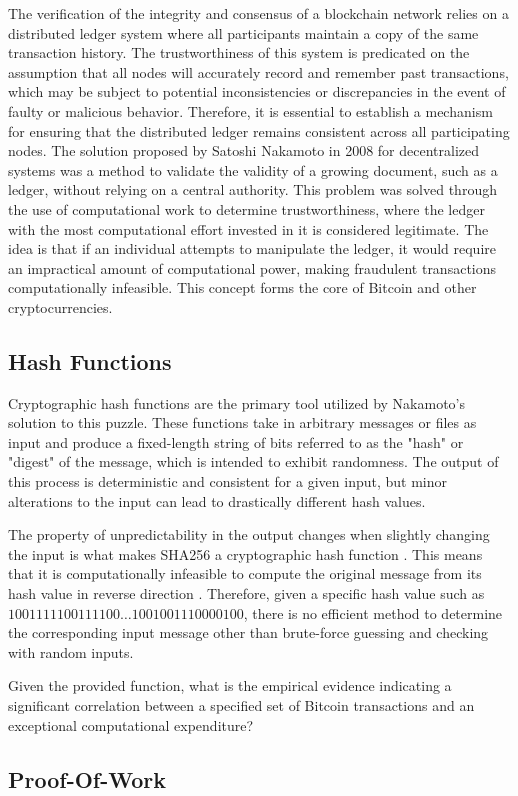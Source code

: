 %

The verification of the integrity and consensus of a blockchain network relies on a distributed ledger system where all participants maintain a copy of the same transaction history. The trustworthiness of this system is predicated on the assumption that all nodes will accurately record and remember past transactions, which may be subject to potential inconsistencies or discrepancies in the event of faulty or malicious behavior. Therefore, it is essential to establish a mechanism for ensuring that the distributed ledger remains consistent across all participating nodes. The solution proposed by Satoshi Nakamoto in 2008 for decentralized systems was a method to validate the validity of a growing document, such as a ledger, without relying on a central authority. This problem was solved through the use of computational work to determine trustworthiness, where the ledger with the most computational effort invested in it is considered legitimate. The idea is that if an individual attempts to manipulate the ledger, it would require an impractical amount of computational power, making fraudulent transactions computationally infeasible. This concept forms the core of Bitcoin and other cryptocurrencies.

\subsection{Hash Functions}
Cryptographic hash functions are the primary tool utilized by Nakamoto's solution to this puzzle. These functions take in arbitrary messages or files as input and produce a fixed-length string of bits referred to as the "hash" or "digest" of the message, which is intended to exhibit randomness. The output of this process is deterministic and consistent for a given input, but minor alterations to the input can lead to drastically different hash values.

The property of unpredictability in the output changes when slightly changing the input is what makes SHA256 a cryptographic hash function \cite{dang2015secure}. This means that it is computationally infeasible to compute the original message from its hash value in reverse direction \cite{butin2017hash}. Therefore, given a specific hash value such as $1001111100111100\ldots1001001110000100$, there is no efficient method to determine the corresponding input message other than brute-force guessing and checking with random inputs.

Given the provided function, what is the empirical evidence indicating a significant correlation between a specified set of Bitcoin transactions and an exceptional computational expenditure?

\subsection{Proof-Of-Work}